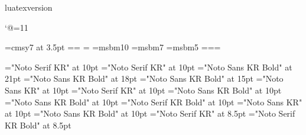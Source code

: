 %
%

\expandafter\ifx\csname luatexversion\endcsname\else
{}
\fi







\usetikzlibrary{intersections,calc,arrows.meta,matrix}

%
%
\catcode`@=11

\font\smallmathtext=cmsy7 at 3.5pt
\newfam\smallfam \textfont\smallfam=\smallmathtext \scriptfont\smallfam=\smallmathtext
\scriptscriptfont\smallfam=\smallmathtext
\def\smallmath{\fam\smallfam}
\font\tenamsb=msbm10 \font\sevenamsb=msbm7 \font\fiveamsb=msbm5
\newfam\bbfam \textfont\bbfam=\tenamsb \scriptfont\bbfam=\sevenamsb \scriptscriptfont\bbfam=\fiveamsb
\def\bbb{\fam\bbfam}
\let\scr=\script

\hangulfont="Noto Serif KR" at 10pt
\hanjafont="Noto Serif KR" at 10pt
\font\titlefont="Noto Sans KR Bold" at 21pt
\font\titlewarningfont="Noto Sans KR Bold" at 18pt
\font\subtitlefont="Noto Sans KR Bold" at 15pt
\font\titleexplainfont="Noto Sans KR" at 10pt
\font\mainfont="Noto Serif KR" at 10pt
\font\headfont="Noto Sans KR Bold" at 10pt
\font\footfont="Noto Sans KR Bold" at 10pt
\font\boldfont="Noto Serif KR Bold" at 10pt
\font\sansfont="Noto Sans KR" at 10pt
\font\bsansfont="Noto Sans KR Bold" at 10pt
\font\explainfont="Noto Serif KR" at 8.5pt
\font\expempfont="Noto Serif KR Bold" at 8.5pt

\let\oldbf\bf
\def\bf{\oldbf\boldfont}
\def\sf{\sansfont}
\def\bsf{\bsansfont}

\let\pdfximage\saveimageresource
\let\pdflastximage\lastsavedimageresourceindex
\let\pdflastximagepages\lastsavedimageresourcepages
\let\pdfrefximage\useimageresource

